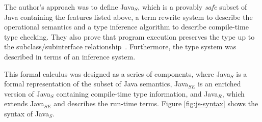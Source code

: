 \documentclass[tese,capa,english]{texufpel}
\begin{document}
The author's approach was to define Java$_S$, which is a provably \emph{safe} subset of Java containing the features listed above, a term rewrite system to describe the operational semantics and a type inference algorithm to describe compile-time type checking. They also prove that program execution preserves the type up to the subclass/subinterface relationship~\cite{Drossopoulou:1999:DSJ:645580.658817}. Furthermore, the type system was described in terms of an inference system.

This formal calculus was designed as a series of components, where Java$_S$ is a formal representation of the subset of Java semantics, Java$_{SE}$ is an enriched version of Java$_S$ containing compile-time type information, and Java$_R$, which extends Java$_{SE}$ and describes the run-time terms. Figure \ref{fig:js-syntax} shows the syntax of Java$_S$.
\end{document}

